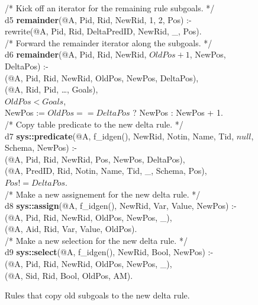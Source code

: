 \begin{figure}[!t]
\ssp
\centering
\begin{boxedminipage}{\linewidth}
/* Kick off an iterator for the remaining rule subgoals. */ \\
d5 {\bf remainder}(@A, Pid, Rid, NewRid, 1, 2, Pos) :- \\
\datalogspace rewrite(@A, Pid, Rid, DeltaPredID, NewRid, \_, Pos). \\

/* Forward the remainder iterator along the subgoals. */ \\
d6 {\bf remainder}(@A, Pid, Rid, NewRid, $OldPos+1$, NewPos, DeltaPos) :- \\
(@A, Pid, Rid, NewRid, OldPos, NewPos, DeltaPos), \\
(@A, Rid, Pid, \ldots, Goals), \\
\datalogspace $OldPos < Goals$, \\
\datalogspace NewPos := $OldPos == DeltaPos$ ? NewPos : NewPos + 1. \\

/* Copy table predicate to the new delta rule. */ \\
d7 {\bf sys::predicate}(@A, f\_idgen(), NewRid, Notin, Name, Tid, $null$, Schema, NewPos) :- \\
(@A, Pid, Rid, NewRid, Pos, NewPos, DeltaPos), \\
(@A, PredID, Rid, Notin, Name, Tid, \_, Schema, Pos), \\
\datalogspace $Pos != DeltaPos$. \\

/* Make a new assignement for the new delta rule. */ \\
d8 {\bf sys::assign}(@A, f\_idgen(), NewRid, Var, Value, NewPos) :- \\
(@A, Pid, Rid, NewRid, OldPos, NewPos, \_), \\
(@A, Aid, Rid, Var, Value, OldPos). \\

/* Make a new selection for the new delta rule. */ \\
d9 {\bf sys::select}(@A, f\_idgen(), NewRid, Bool, NewPos) :- \\
(@A, Pid, Rid, NewRid, OldPos, NewPos, \_), \\
(@A, Sid, Rid, Bool, OldPos, AM).

\end{boxedminipage}
\caption{\label{ch:evita:fig:delta3}Rules that copy old subgoals to the new delta rule.}
\end{figure}

